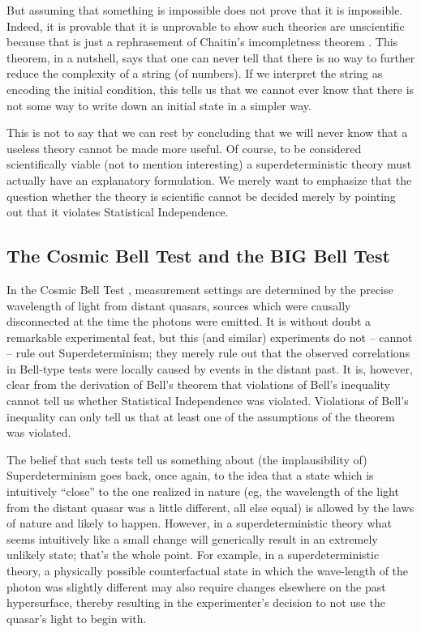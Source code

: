 \documentclass[12pt]{article}
\begin{document}
But assuming that something is impossible does not prove that it is impossible. Indeed, it is provable that it is unprovable to show such theories are unscientific because that is just a rephrasement of Chaitin's imcompletness theorem \cite{Chaitin}. This theorem, in a nutshell, says that one can never tell that there is no way to further reduce the complexity of a string (of numbers). If we interpret the string as encoding the initial condition, this tells us that we cannot ever know that there is not some way to write down an initial state in a simpler way. 

This is not to say that we can rest by concluding that we will never know that a useless theory cannot be made more useful. Of course, to be considered scientifically viable (not to mention interesting) a superdeterministic theory must actually have an explanatory formulation. We merely want to emphasize that the question whether the theory is scientific cannot be decided merely by pointing out that it violates Statistical Independence. 


\subsection{The Cosmic Bell Test and the BIG Bell Test}
\label{photon}

In the Cosmic Bell Test \cite{Handsteiner:2016ulx}, measurement settings are determined by the precise wavelength of light from distant quasars, sources which were causally disconnected at the time the photons were emitted. It is without doubt a remarkable experimental feat, but this (and similar) experiments do not -- cannot -- rule out Superdeterminism; they merely rule out that the observed correlations in Bell-type tests were locally caused by events in the distant past. It is, however, clear from the derivation of Bell's theorem that violations of Bell's inequality cannot tell us whether Statistical Independence was violated. Violations of Bell's inequality can only tell us that at least one of the assumptions of the theorem was violated.


The belief that such tests tell us something about (the implausibility of) Superdeterminism goes back, once again, to the idea that a state which is intuitively ``close'' to the one realized in nature  (eg, the wavelength of the light from the distant quasar was a little different, all else equal) is allowed by the laws of nature and likely to happen. However, in a superdeterministic theory what seems intuitively like a small change will generically result in an extremely unlikely state; that's the whole point. For example, in a superdeterministic theory, a physically possible counterfactual state in which the wave-length of the photon was slightly different may also require changes elsewhere on the past hypersurface, thereby resulting in the experimenter's decision to not use the quasar's light to begin with. 
\end{document}
